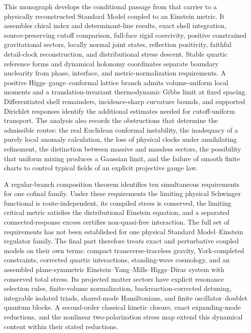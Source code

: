 \documentclass[11pt,a4paper,oneside]{book}
\theoremstyle{plain}
\theoremstyle{definition}
\theoremstyle{remark}
\begin{document}
This monograph develops the conditional passage from that carrier to a physically reconstructed Standard Model coupled to an Einstein metric. It assembles chiral index and determinant-line results, exact shell integration, source-preserving cutoff comparison, full-face rigid coercivity, positive constrained gravitational sectors, locally normal joint states, reflection positivity, faithful detail-clock reconstruction, and distributional stress descent. Stable quartic reference forms and dynamical holonomy coordinates separate boundary nuclearity from phase, interface, and metric-normalization requirements. A positive Higgs--gauge--conformal lattice branch admits volume-uniform local moments and a translation-invariant thermodynamic Gibbs limit at fixed spacing. Differentiated shell remainders, incidence-sharp curvature bounds, and supported Dirichlet responses identify the additional estimates needed for cutoff-uniform transport. The analysis also records the obstructions that determine the admissible routes: the real Euclidean conformal instability, the inadequacy of a purely local anomaly calculation, the loss of physical clocks under annihilating refinement, the distinction between massive and massless sectors, the possibility that uniform mixing produces a Gaussian limit, and the failure of smooth finite charts to control typical fields of an explicit projective gauge law.

A regular-branch composition theorem identifies ten simultaneous requirements for one cofinal family. Under these requirements the limiting physical Schwinger functional is route-independent, its compiled stress is conserved, the limiting critical metric satisfies the distributional Einstein equation, and a separated connected-response excess certifies non-quasi-free interaction. The full set of requirements has not been established for one physical Standard Model--Einstein regulator family. The final part therefore treats exact and perturbative coupled models on their own terms: compact transverse-traceless gravity, York-completed constraints, corrected quartic interactions, standing-wave cosmology, and an assembled plane-symmetric Einstein--Yang--Mills--Higgs--Dirac system with conserved total stress. Its projected matter sectors have explicit resonance selection rules, finite-volume normalization, backreaction-corrected detuning, integrable isolated triads, shared-mode Hamiltonians, and finite oscillator--doublet quantum blocks. A second-order classical kinetic closure, exact expanding-mode reductions, and the nonlinear two-polarization stress map extend this dynamical content within their stated reductions.
\end{document}

